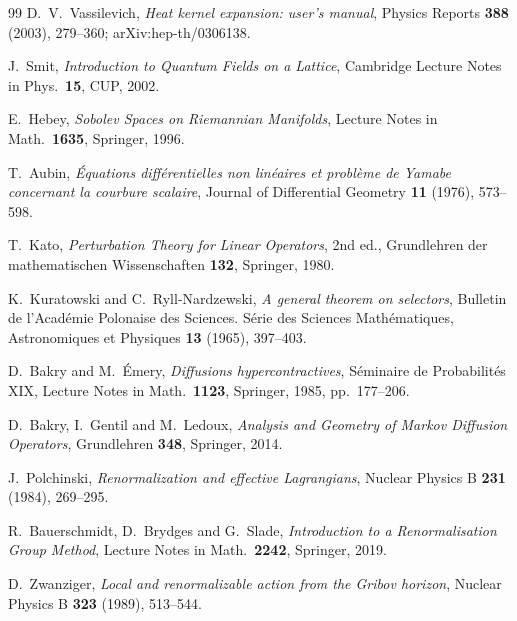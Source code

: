 \documentclass[11pt,a4paper]{amsart}
\theoremstyle{definition}
\begin{document}
\begin{thebibliography}{99}
D.~V.~Vassilevich,
\emph{Heat kernel expansion: user's manual},
Physics Reports \textbf{388} (2003), 279--360; arXiv:hep-th/0306138.

J.~Smit,
\emph{Introduction to Quantum Fields on a Lattice},
Cambridge Lecture Notes in Phys.\ \textbf{15}, CUP, 2002.

E.~Hebey,
\emph{Sobolev Spaces on Riemannian Manifolds},
Lecture Notes in Math.\ \textbf{1635}, Springer, 1996.

T.~Aubin,
\emph{\'Equations diff\'erentielles non lin\'eaires et probl\`eme de Yamabe
concernant la courbure scalaire},
Journal of Differential Geometry \textbf{11} (1976), 573--598.

T.~Kato,
\emph{Perturbation Theory for Linear Operators},
2nd ed., Grundlehren der mathematischen Wissenschaften \textbf{132}, Springer, 1980.

K.~Kuratowski and C.~Ryll-Nardzewski,
\emph{A general theorem on selectors},
Bulletin de l'Acad\'emie Polonaise des Sciences. S\'erie des Sciences Math\'ematiques, Astronomiques et Physiques
\textbf{13} (1965), 397--403.

D.~Bakry and M.~\'Emery,
\emph{Diffusions hypercontractives},
S\'eminaire de Probabilit\'es XIX, Lecture Notes in Math.\ \textbf{1123},
Springer, 1985, pp.~177--206.

D.~Bakry, I.~Gentil and M.~Ledoux,
\emph{Analysis and Geometry of Markov Diffusion Operators},
Grundlehren \textbf{348}, Springer, 2014.

J.~Polchinski,
\emph{Renormalization and effective Lagrangians},
Nuclear Physics B \textbf{231} (1984), 269--295.

R.~Bauerschmidt, D.~Brydges and G.~Slade,
\emph{Introduction to a Renormalisation Group Method},
Lecture Notes in Math.\ \textbf{2242}, Springer, 2019.

D.~Zwanziger,
\emph{Local and renormalizable action from the Gribov horizon},
Nuclear Physics B \textbf{323} (1989), 513--544.

\end{thebibliography}
\end{document}
